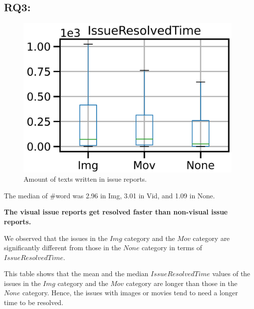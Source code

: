 \subsection*{RQ3: \RQthree{}}
\begin{figure}[t]
    \centering
    \includegraphics[width=0.6\linewidth]{./figures/fixes.png}
    \caption{Amount of texts written in issue reports. }
    \label{fig:words}
\end{figure}
The median of \#word was 2.96 in Img, 3.01 in Vid, and 1.09 in None.

\textbf{The visual issue reports get resolved faster than non-visual issue reports. }

We observed that the issues in the $Img$ category and 
the $Mov$ category are significantly different from those 
in the $None$ category in terms of $IssueResolvedTime$. 

This table shows that 
the mean and the median $IssueResolvedTime$ values of 
the issues in the $Img$ category and the $Mov$ category are 
longer than those in the $None$ category. 
Hence, the issues with images or movies tend to need 
a longer time to be resolved. 

